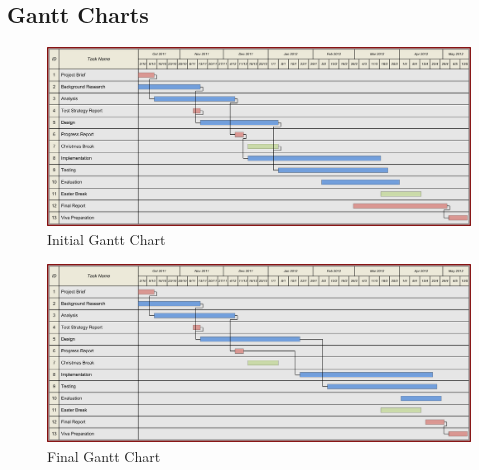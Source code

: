 \clearpage
\begin{landscape}
\subsection{Gantt Charts}
\begin{figure}[htb]
\centering
\includegraphics[scale=0.75]{img/3yp-gantt.png}
\caption{Initial Gantt Chart}
\label{fig:chart-1}
\end{figure}
\end{landscape}
\clearpage
\begin{landscape}
\begin{figure}[htb]
\centering
\includegraphics[scale=0.75]{img/3yp-gantt-final.png}
\caption{Final Gantt Chart}
\label{fig:chart-2}
\end{figure}
\end{landscape}

